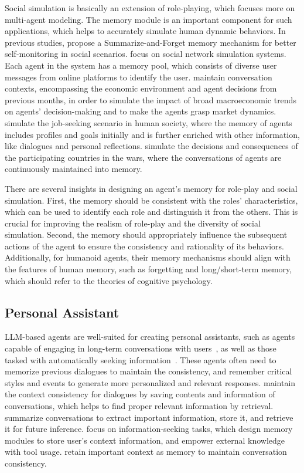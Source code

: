 \documentclass{article}
\theoremstyle{definition}
\theoremstyle{theorem}
\theoremstyle{proof}
\theoremstyle{remark}
\newcommand{\zjm}[1]{\textcolor{magenta}{[#1]$_{zjm}$}}
\begin{document}
	Social simulation is basically an extension of role-playing, which focuses more on multi-agent modeling. The memory module is an important component for such applications, which helps to accurately simulate human dynamic behaviors. 
	In previous studies, \citet{lyfe_agents} propose a Summarize-and-Forget memory mechanism for better self-monitoring in social scenarios. \citet{s3} focus on social network simulation systems. Each agent in the system has a memory pool, which consists of diverse user messages from online platforms to identify the user. \citet{li2023large} maintain conversation contexts, encompassing the economic environment and agent decisions from previous months, in order to simulate the impact of broad macroeconomic trends on agents’ decision-making and to make the agents grasp market dynamics. \citet{metaagents} simulate the job-seeking scenario in human society, where the memory of agents includes profiles and goals initially and is further enriched with other information, like dialogues and personal reflections. \citet{waragent} simulate the decisions and consequences of the participating countries in the wars, where the conversations of agents are continuously maintained into memory.
	
	There are several insights in designing an agent's memory for role-play and social simulation. First, the memory should be consistent with the roles' characteristics, which can be used to identify each role and distinguish it from the others. This is crucial for improving the realism of role-play and the diversity of social simulation. Second, the memory should appropriately influence the subsequent actions of the agent to ensure the consistency and rationality of its behaviors.
	Additionally, for humanoid agents, their memory mechanisms should align with the features of human memory, such as forgetting and long/short-term memory, which should refer to the theories of cognitive psychology.
	
	\subsection{Personal Assistant}
	
	LLM-based agents are well-suited for creating personal assistants, such as agents capable of engaging in long-term conversations with users~\cite{memochat,mpc,autogen}, as well as those tasked with automatically seeking information~\cite{kwaiagents}.
	These agents often need to memorize previous dialogues to maintain the consistency, and remember critical styles and events to generate more personalized and relevant responses.
	\citet{memochat} maintain the context consistency for dialogues by saving contents and information of conversations, which helps to find proper relevant information by retrieval. \citet{mpc} summarize conversations to extract important information, store it, and retrieve it for future inference. \citet{kwaiagents} focus on information-seeking tasks, which design memory modules to store user's context information, and empower external knowledge with tool usage. \citet{autogen} retain important context as memory to maintain conversation consistency. %
	
\end{document}

